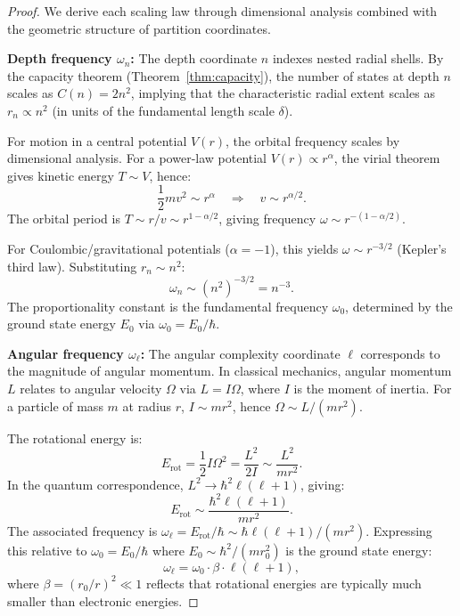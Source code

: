 \documentclass[twocolumn,10pt,a4paper]{article}
\theoremstyle{remark}
\begin{document}
\begin{proof}
We derive each scaling law through dimensional analysis combined with the geometric structure of partition coordinates.

\textbf{Depth frequency $\omega_n$:} The depth coordinate $n$ indexes nested radial shells. By the capacity theorem (Theorem~\ref{thm:capacity}), the number of states at depth $n$ scales as $C(n) = 2n^2$, implying that the characteristic radial extent scales as $r_n \propto n^2$ (in units of the fundamental length scale $\delta$). 

For motion in a central potential $V(r)$, the orbital frequency scales by dimensional analysis. For a power-law potential $V(r) \propto r^\alpha$, the virial theorem gives kinetic energy $T \sim V$, hence:
\begin{equation}
\frac{1}{2} m v^2 \sim r^\alpha \quad \Rightarrow \quad v \sim r^{\alpha/2}.
\end{equation}
The orbital period is $T \sim r/v \sim r^{1-\alpha/2}$, giving frequency $\omega \sim r^{-(1-\alpha/2)}$.

For Coulombic/gravitational potentials ($\alpha = -1$), this yields $\omega \sim r^{-3/2}$ (Kepler's third law). Substituting $r_n \sim n^2$:
\begin{equation}
\omega_n \sim (n^2)^{-3/2} = n^{-3}.
\end{equation}
The proportionality constant is the fundamental frequency $\omega_0$, determined by the ground state energy $E_0$ via $\omega_0 = E_0 / \hbar$.

\textbf{Angular frequency $\omega_\ell$:} The angular complexity coordinate $\ell$ corresponds to the magnitude of angular momentum. In classical mechanics, angular momentum $L$ relates to angular velocity $\Omega$ via $L = I \Omega$, where $I$ is the moment of inertia. For a particle of mass $m$ at radius $r$, $I \sim mr^2$, hence $\Omega \sim L/(mr^2)$.

The rotational energy is:
\begin{equation}
E_{\text{rot}} = \frac{1}{2} I \Omega^2 = \frac{L^2}{2I} \sim \frac{L^2}{mr^2}.
\end{equation}
In the quantum correspondence, $L^2 \to \hbar^2 \ell(\ell+1)$, giving:
\begin{equation}
E_{\text{rot}} \sim \frac{\hbar^2 \ell(\ell+1)}{mr^2}.
\end{equation}
The associated frequency is $\omega_\ell = E_{\text{rot}}/\hbar \sim \hbar \ell(\ell+1)/(mr^2)$. Expressing this relative to $\omega_0 = E_0/\hbar$ where $E_0 \sim \hbar^2/(mr_0^2)$ is the ground state energy:
\begin{equation}
\omega_\ell = \omega_0 \cdot \beta \cdot \ell(\ell+1),
\end{equation}
where $\beta = (r_0/r)^2 \ll 1$ reflects that rotational energies are typically much smaller than electronic energies.


\end{proof}
\end{document}
